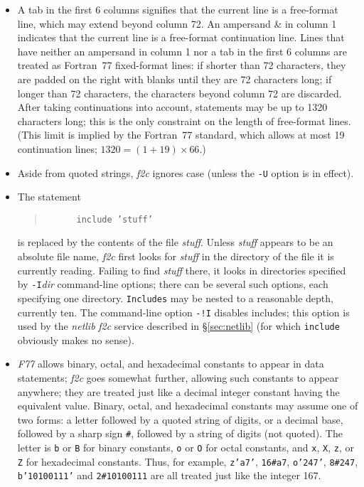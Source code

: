 \documentclass[10pt,a4paper]{article}
\begin{document}
\begin{itemize}
\item A tab in the first 6 columns signifies that the current line is a free-format line, which may extend beyond column 72. An ampersand \& in column 1 indicates that the current line is a free-format continuation line. Lines that have neither an ampersand in column 1 nor a tab in the first 6 columns are treated as Fortran~77 fixed-format lines: if shorter than 72 characters, they are padded on the right with blanks until they are 72 characters long; if longer than 72 characters, the characters beyond column 72 are discarded. After taking continuations into account, statements may be up to 1320 characters long; this is the only constraint on the length of free-format lines. (This limit is implied by the Fortran~77 standard, which allows at most 19 continuation lines; $1320 = ( 1 + 19 ) \times 66$.)

\item Aside from quoted strings, \emph{f2c} ignores case (unless the \verb|-U| option is in effect).

\item The statement
\begin{quote}
\begin{verbatim}
      include ’stuff’
\end{verbatim}
\end{quote}
is replaced by the contents of the file \emph{stuff}. Unless \emph{stuff} appears to be an absolute file name, \emph{f2c} first looks for \emph{stuff} in the directory of the file it is currently reading. Failing to find \emph{stuff} there, it looks in directories specified by \verb|-I|\emph{dir} command-line options; there can be several such options, each specifying one directory. \verb|Includes| may be nested to a reasonable depth, currently ten. The command-line option \verb|-!I| disables includes; this option is used by the \emph{netlib} \emph{f2c} service described in §\ref{sec:netlib} (for which \verb|include| obviously makes no sense).

\item \emph{F77} allows binary, octal, and hexadecimal constants to appear in data statements; \emph{f2c} goes somewhat further, allowing such constants to appear anywhere; they are treated just like a decimal integer constant having the equivalent value. Binary, octal, and hexadecimal constants may assume one of two forms: a letter followed by a quoted string of digits, or a decimal base, followed by a sharp sign \verb|#|, followed by a string of digits (not quoted). The letter is \verb|b| or \verb|B| for binary constants, \verb|o| or \verb|O| for octal constants, and \verb|x|, \verb|X|, \verb|z|, or \verb|Z| for hexadecimal constants. Thus, for example, \verb|z’a7’|, \verb|16#a7|, \verb|o’247’|, \verb|8#247|, \verb|b’10100111’| and \verb|2#10100111| are all treated just like the integer 167.


\end{itemize}
\end{document}
